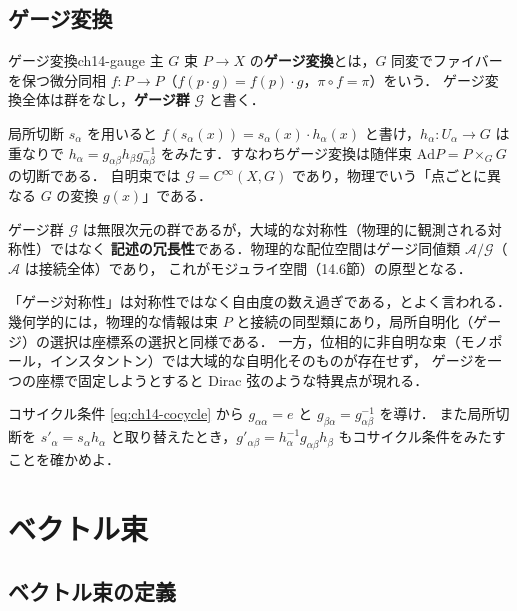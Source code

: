\subsection{ゲージ変換}

\begin{mydef}{ゲージ変換}{ch14-gauge}
主 $G$ 束 $P\to X$ の\textbf{ゲージ変換}とは，$G$ 同変でファイバーを保つ微分同相 $f:P\to P$（$f(p\cdot g)=f(p)\cdot g$，$\pi\circ f=\pi$）をいう．
ゲージ変換全体は群をなし，\textbf{ゲージ群} $\mathcal{G}$ と書く．
\end{mydef}

局所切断 $s_\alpha$ を用いると $f(s_\alpha(x)) = s_\alpha(x)\cdot h_\alpha(x)$ と書け，$h_\alpha:U_\alpha\to G$ は重なりで
$h_\alpha = g_{\alpha\beta}h_\beta g_{\alpha\beta}^{-1}$ をみたす．すなわちゲージ変換は随伴束 $\mathrm{Ad}P=P\times_G G$ の切断である．
自明束では $\mathcal{G}=C^\infty(X,G)$ であり，物理でいう「点ごとに異なる $G$ の変換 $g(x)$」である．

ゲージ群 $\mathcal{G}$ は無限次元の群であるが，大域的な対称性（物理的に観測される対称性）ではなく
\textbf{記述の冗長性}である．物理的な配位空間はゲージ同値類 $\mathcal{A}/\mathcal{G}$（$\mathcal{A}$ は接続全体）であり，
これがモジュライ空間（14.6節）の原型となる．

\begin{physbox}[ゲージ変換は冗長性]
「ゲージ対称性」は対称性ではなく自由度の数え過ぎである，とよく言われる．
幾何学的には，物理的な情報は束 $P$ と接続の同型類にあり，局所自明化（ゲージ）の選択は座標系の選択と同様である．
一方，位相的に非自明な束（モノポール，インスタントン）では大域的な自明化そのものが存在せず，
ゲージを一つの座標で固定しようとすると Dirac 弦のような特異点が現れる．
\end{physbox}

コサイクル条件 \eqref{eq:ch14-cocycle} から $g_{\alpha\alpha}=e$ と $g_{\beta\alpha}=g_{\alpha\beta}^{-1}$ を導け．
また局所切断を $s'_\alpha=s_\alpha h_\alpha$ と取り替えたとき，$g'_{\alpha\beta}=h_\alpha^{-1}g_{\alpha\beta}h_\beta$ もコサイクル条件をみたすことを確かめよ．

\section{ベクトル束}

\subsection{ベクトル束の定義}

